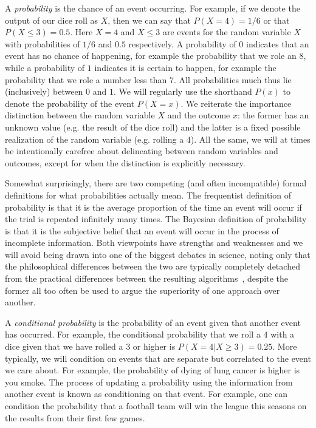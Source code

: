 A \emph{probability} is
the chance of an event occurring.  For example, if we denote the output
of our dice roll as $X$, then we can say that $P(X=4) = 1/6$ or that $P(X\le3) = 0.5$.  Here
$X=4$ and $X\le3$ are events for the random variable $X$ with probabilities of $1/6$ and $0.5$
respectively.   A probability of $0$ indicates that an event has no chance of happening, 
for example the probability that we role an $8$, while
a probability of $1$ indicates it is certain to happen, for example the probability 
that we role a number less than $7$.  All probabilities much thus lie (inclusively) between $0$ and $1$.  
We will regularly use the shorthand $P(x)$ to denote the probability of the event $P(X=x)$.  
We reiterate the importance distinction between the random variable $X$ and the outcome $x$:
the former has an unknown value (e.g. the result of the dice roll) and the latter is
a fixed possible realization of the random variable (e.g. rolling a $4$).
All the same, we will at times be intentionally carefree about delineating between
random variables and outcomes, except for when the distinction is explicitly necessary.

Somewhat surprisingly, there are two competing (and often incompatible)
formal definitions for what probabilities actually mean.  The frequentist definition of
probability is that it is the average proportion of the time an event will occur if the trial is 
repeated infinitely many times.  The Bayesian definition of probability is that it is the subjective
belief that an event will occur in the process of incomplete information.  Both viewpoints have
strengths and weaknesses and we will avoid being drawn into one of the biggest debates in
science, noting only that the philosophical differences between the two are typically completely
detached from the practical differences between the resulting
algorithms~\citep{steinhardt2012beyond}, despite the former all too often be used to argue
the superiority of one approach over another.

A \emph{conditional probability} is the probability of an event given that another event has occurred.
For example, the conditional probability that we roll a $4$ with a dice given that we have rolled a $3$ or
higher is $P(X=4 | X\ge3) = 0.25$.  More typically, we will condition on events that are separate but
correlated to the event we care about.  For example, the probability of dying of lung cancer is higher
is you smoke.  The process of updating a probability using the information from another event is
known as conditioning on that event.  For example, one can condition the probability that a football team
will win the league this seasons on the results from their first few games.  

